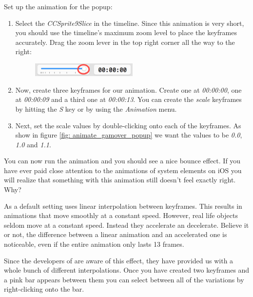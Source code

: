 \begin{leftbar}
Set up the animation for the popup:
\begin{enumerate}
  \item Select the \textit{CCSprite9Slice} in the timeline. Since this animation is very
short, you should use the timeline's maximum zoom level to place the keyframes
accurately. Drag the zoom lever in the top right corner all the way to the
right:
\begin{figure}[H]
    \centering
    \includegraphics[width=150pt]{images/Chapter7/timeline_zoom.png}
\end{figure}

\item Now, create three keyframes for our animation. Create one at
\textit{00:00:00}, one at \textit{00:00:09} and a third one at
\textit{00:00:13}. You can create the \textit{scale} keyframes by hitting the
\textit{S} key or by using the \textit{Animation} menu.

\item Next, set the scale values by double-clicking onto each of the keyframes. As show in figure \ref{fig: animate_gamover_popup} we want the
values to be \textit{0.0}, \textit{1.0} and \textit{1.1}.
\end{enumerate}
\end{leftbar}

You can now run the animation and you should see a nice bounce effect. If you
have ever paid close attention to the animations of system elements on iOS you
will realize that something with this animation still doesn't feel exactly
right. Why?

As a default setting \SB{} uses linear interpolation between
keyframes.\label{timeline_interpolation} This results in animations
that move smoothly at a constant speed. However, real life objects seldom move at a constant speed. Instead they accelerate an decelerate.
Believe it or not, the difference between a linear animation and an accelerated
one is noticeable, even if the entire animation only lasts 13 frames.

Since the developers of \cocos{} are aware of this effect, they have provided us
with a whole bunch of different interpolations. Once you have created two
keyframes and a pink bar appears between them you can select between all of
the variations by right-clicking onto the bar.

